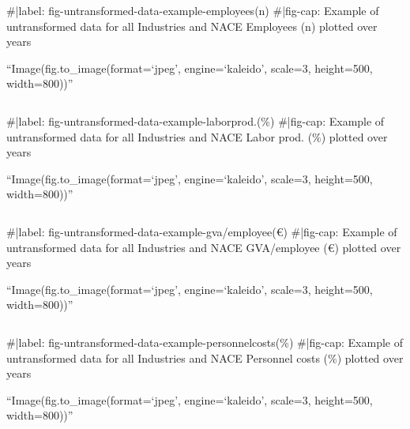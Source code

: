\documentclass[
  11,
  a4paperpaper,
]{article}
\newenvironment{Shaded}{\begin{snugshade}}{\end{snugshade}}
\newcommand{\NormalTok}[1]{\textcolor[rgb]{0.00,0.23,0.31}{#1}}
\begin{document}
\begin{verbatim}
\end{verbatim}

\begin{Shaded}
\begin{Highlighting}[]
\NormalTok{\#|label: fig{-}untransformed{-}data{-}example{-}employees(n)}
\NormalTok{\#|fig{-}cap: \textquotesingle{}Example of untransformed data for all Industries and NACE Employees (n) plotted over years\textquotesingle{}}
\end{Highlighting}
\end{Shaded}

``Image(fig.to\_image(format=`jpeg', engine=`kaleido', scale=3,
height=500, width=800))''

\begin{verbatim}
\end{verbatim}

\begin{Shaded}
\begin{Highlighting}[]
\NormalTok{\#|label: fig{-}untransformed{-}data{-}example{-}laborprod.(\%)}
\NormalTok{\#|fig{-}cap: \textquotesingle{}Example of untransformed data for all Industries and NACE Labor prod. (\%) plotted over years\textquotesingle{}}
\end{Highlighting}
\end{Shaded}

``Image(fig.to\_image(format=`jpeg', engine=`kaleido', scale=3,
height=500, width=800))''

\begin{verbatim}
\end{verbatim}

\begin{Shaded}
\begin{Highlighting}[]
\NormalTok{\#|label: fig{-}untransformed{-}data{-}example{-}gva/employee(€)}
\NormalTok{\#|fig{-}cap: \textquotesingle{}Example of untransformed data for all Industries and NACE GVA/employee (€) plotted over years\textquotesingle{}}
\end{Highlighting}
\end{Shaded}

``Image(fig.to\_image(format=`jpeg', engine=`kaleido', scale=3,
height=500, width=800))''

\begin{verbatim}
\end{verbatim}

\begin{Shaded}
\begin{Highlighting}[]
\NormalTok{\#|label: fig{-}untransformed{-}data{-}example{-}personnelcosts(\%)}
\NormalTok{\#|fig{-}cap: \textquotesingle{}Example of untransformed data for all Industries and NACE Personnel costs (\%) plotted over years\textquotesingle{}}
\end{Highlighting}
\end{Shaded}

``Image(fig.to\_image(format=`jpeg', engine=`kaleido', scale=3,
height=500, width=800))''

\begin{verbatim}
\end{verbatim}
\end{document}

